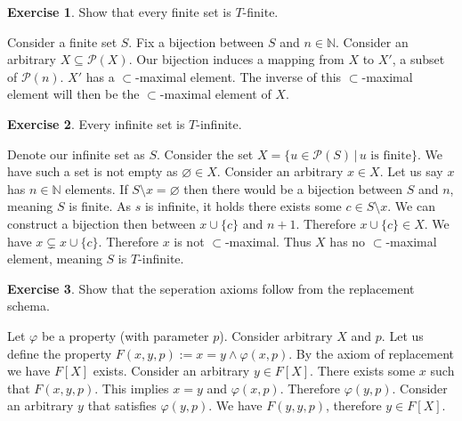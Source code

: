 \documentclass{article}
\theoremstyle{definition}
\newtheorem{exer}{Exercise}[section]
\newcommand{\powset}[1]{\mathcal{P}(#1)}
\newcommand{\N}{\mathbb{N}}
\newcommand*{\mtset}{\ensuremath{\varnothing}}
\newlength{\defparindent}
\newenvironment{answer}
    {\begin{mdframed}[backgroundcolor=gray!15, linewidth=0pt] \setlength{\parindent}{\defparindent}}
    {\end{mdframed}}
\begin{document}
\begin{exer}
    Show that every finite set is $T$-finite.
    \begin{answer}
        Consider a finite set $S$. Fix a bijection between $S$ and $n \in \N$. Consider an arbitrary $X \subseteq \powset{X}$. Our bijection induces a mapping from $X$ to $X'$, a subset of $\powset{n}$. $X'$ has a $\subset$-maximal element. The inverse of this $\subset$-maximal element will then be the $\subset$-maximal element of $X$.
    \end{answer}
\end{exer}

\begin{exer}
    Every infinite set is $T$-infinite.
    \begin{answer}
        Denote our infinite set as $S$. Consider the set $X = \{u \in \powset{S} \, | \, \text{$u$ is finite}\}$. We have such a set is not empty as $\mtset \in X$. Consider an arbitrary $x \in X$. Let us say $x$ has $n \in \N$ elements. If $S \setminus x = \mtset$ then there would be a bijection between $S$ and $n$, meaning $S$ is finite. As $s$ is infinite, it holds there exists some $c \in S \setminus x$. We can construct a bijection then between $x \cup \{c\}$ and $n + 1$. Therefore $x \cup \{c\} \in X$. We have $x \subsetneq x \cup \{c\}$. Therefore $x$ is not $\subset$-maximal. Thus $X$ has no $\subset$-maximal element, meaning $S$ is $T$-infinite.
    \end{answer}
\end{exer}

\newpage

\begin{exer}
    Show that the seperation axioms follow from the replacement schema.
    \begin{answer}
        Let $\varphi$ be a property (with parameter $p$). Consider arbitrary $X$ and $p$. Let us define the property $F(x, y, p) := x = y \land \varphi(x, p)$. By the axiom of replacement we have $F[X]$ exists. Consider an arbitrary $y \in F[X]$. There exists some $x$ such that $F(x, y, p)$. This implies $x = y$ and $\varphi(x, p)$. Therefore $\varphi(y, p)$. Consider an arbitrary $y$ that satisfies $\varphi(y, p)$. We have $F(y, y, p)$, therefore $y \in F[X]$.
    \end{answer}
\end{exer}
\end{document}
